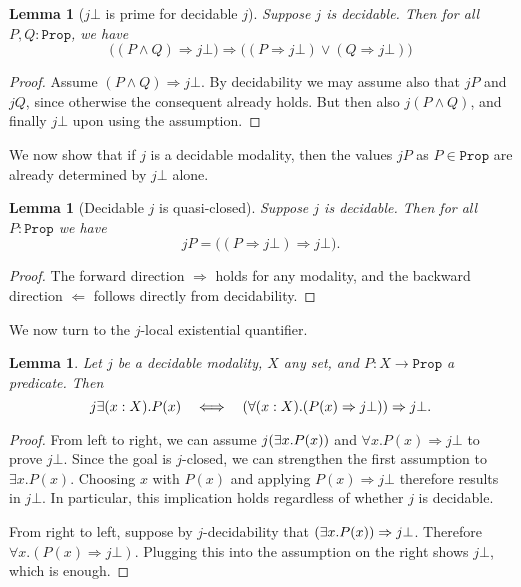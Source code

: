 \documentclass[reqno,11pt]{amsproc}
\theoremstyle{plain}
\newtheorem{lemma}[theorem]{Lemma}
\theoremstyle{definition}
\newcommand{\Const}[1]{\mathtt{#1}}
\renewcommand{\to}[1][]{\xrightarrow{#1}}
\newcommand{\prop}{\Const{Prop}}
\newcommand{\imp}{\Rightarrow}
\let\originalleft\left
\let\originalright\right
\renewcommand{\left}{\mathopen{}\mathclose\bgroup\originalleft}
\renewcommand{\right}{\aftergroup\egroup\originalright}
\numberwithin{equation}{section}
\begin{document}
\begin{lemma}[$j \bot$ is prime for decidable $j$]
Suppose $j$ is decidable. Then for all $P,Q:\prop$, we have
\[\big((P\wedge Q)\imp j \bot\big)\imp\big((P\imp j \bot)\lor(Q\imp j \bot)\big)\]
\end{lemma}

\begin{proof}
Assume $(P\wedge Q)\imp j \bot$. By decidability we may assume also that $j P$ and $j Q$, since otherwise the consequent already holds. But then also $j (P\wedge Q)$, and finally $j \bot$ upon using the assumption.
\end{proof}

We now show that if $j$ is a decidable modality, then the values $jP$ as $P \in \prop$ are already determined by $j\bot$ alone.

\begin{lemma}[Decidable $j$ is quasi-closed]
	Suppose $j$ is decidable. Then for all $P:\prop$ we have
	\[
		j P=\big((P\imp j\bot)\imp j\bot\big).
	\]
\end{lemma}

\begin{proof}
	The forward direction $\Rightarrow$ holds for any modality, and the backward direction $\Leftarrow$ follows directly from decidability.
\end{proof}

We now turn to the $j$-local existential quantifier.

\begin{lemma}
	Let $j$ be a decidable modality, $X$ any set, and $P : X \to \prop$ a predicate. Then
	\[
		j \exists (x : X) . P(x) \quad \Longleftrightarrow \quad \left( \forall (x : X). (P(x) \imp j \bot) \right) \imp j \bot.
	\]
\end{lemma}

\begin{proof}
	From left to right, we can assume $j \left( \exists x. P(x)\right)$ and $\forall x. P(x) \imp j\bot$ to prove $j\bot$. Since the goal is $j$-closed, we can strengthen the first assumption to $\exists x. P(x)$. Choosing $x$ with $P(x)$ and applying $P(x) \imp j\bot$ therefore results in $j\bot$. In particular, this implication holds regardless of whether $j$ is decidable.

	From right to left, suppose by $j$-decidability that $\left( \exists x. P(x) \right) \imp j\bot$. Therefore $\forall x. (P(x) \imp j\bot)$. Plugging this into the assumption on the right shows $j\bot$, which is enough.
\end{proof}
\end{document}
